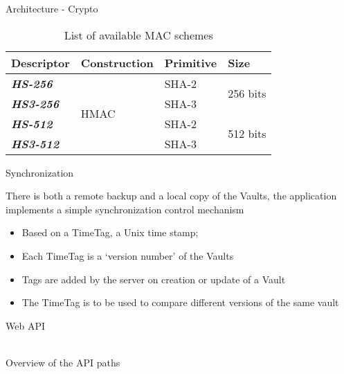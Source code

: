 \documentclass[newPxFont,noprogressbar,table]{beamer}
\begin{document}
\begin{frame}{Architecture - Crypto}
\begin{table}
\caption{List of available MAC schemes}
\scalebox{0.65}
{
\centering
\begin{tabular}{llll}
\hline
\textbf{Descriptor}       & \textbf{Construction} & \textbf{Primitive} & \textbf{Size}             \\ \hline
\textit{\textbf{HS-256}}  & \multirow{4}{*}{HMAC} & SHA-2             & \multirow{2}{*}{256 bits} \\ \cline{1-1} \cline{3-3}
\textit{\textbf{HS3-256}} &                       & SHA-3               &                           \\ \cline{1-1} \cline{3-4} 
\textit{\textbf{HS-512}}  &                       & SHA-2             & \multirow{2}{*}{512 bits} \\ \cline{1-1} \cline{3-3}
\textit{\textbf{HS3-512}} &                       & SHA-3               &                           \\ \hline
\end{tabular}
}
\end{table}
\end{frame}

\begin{frame}{Synchronization}

\vspace*{-4em}

There is both a remote backup and a local copy of the \textcolor{sthlmBlue}{Vaults}, the application implements a simple synchronization control mechanism

\begin{itemize}
\item Based on a \textcolor{sthlmBlue}{TimeTag}, a Unix time stamp;
\item Each \textcolor{sthlmBlue}{TimeTag} is a `version number' of the \textcolor{sthlmBlue}{Vaults}
\item Tags are added by the server on creation or update of a \textcolor{sthlmBlue}{Vault}
\item The \textcolor{sthlmBlue}{TimeTag} is to be used to compare different versions of the same vault

\end{itemize}

\end{frame}

\begin{frame}{Web API}

\vspace*{-3em}
\centering
{}\\
Overview of the API paths

\end{frame}
\end{document}
